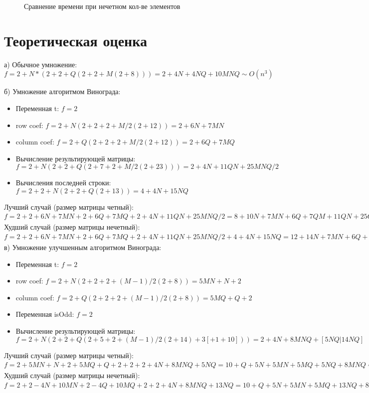 	
	\newpage
	
	\begin{figure}[h!]
		\center{\texttt{[image: 4et]}}
		\caption{Сравнение времени при четном кол-ве элементов}
		
		\hfill
		
		\center{\texttt{[image: ne4et]}}
		\caption{Сравнение времени при нечетном кол-ве элементов}
	\end{figure}


	\newpage
	\section{Теоретическая оценка }
	\flushleft
	а) Обычное умножение:\\
	$f = 2+N*(2+2+Q(2+2+M(2+8))) = 2+4N+4NQ+10MNQ \sim O(n^3)$
	
	б) Умножение алгоритмом Винограда:
	\begin{itemize}
		\item Переменная t: $f = 2$
		\item row coef: $f = 2+N(2+2+2+M/2(2+12)) = 2+6N+7MN$
		\item column coef: $f = 2+Q(2+2+2+M/2(2+12)) = 2+6Q+7MQ$
		\item Вычисление результирующей матрицы: $f = 2+N(2+2+Q(2+7+2+M/2(2+23))) = 2+4N+11QN+25MNQ/2$
		\item Вычисления последней строки: $f = 2+2+N(2+2+Q(2+13)) = 4+4N+15NQ$ 
	\end{itemize}
	Лучший случай (размер матрицы четный): $f = 2+2+6N+7MN+2+6Q+7MQ+2+4N+11QN+25MNQ/2 = 8+10N+7MN+6Q+7QM+11QN+25QMN/2 \sim O(n^3)$\\
	Худший случай (размер матрицы нечетный): $f = 2+2+6N+7MN+2+6Q+7MQ+2+4N+11QN+25MNQ/2+4+4N+15NQ = 12+14N+7MN+6Q+7QM+26QN+25QMN/2 \sim O(n^3)$\\
	
	в) Умножение улучшенным алгоритмом Винограда:\\
	\begin{itemize}
		\item Переменная t: $f = 2$
		\item row coef: $f = 2+N(2+2+2+(M-1)/2(2+8)) = 5MN+N+2$
		\item column coef: $f = 2+Q(2+2+2+(M-1)/2(2+8)) = 5MQ+Q+2$
		\item Переменная isOdd: $f = 2$
		\item Вычисление результирующей матрицы: $f = 2+N(2+2+Q(2+5+2+(M-1)/2(2+14)+3[+1+10])) = 2+4N+8MNQ+[5NQ|14NQ]$
	\end{itemize}
	Лучший случай (размер матрицы четный): $f = 2+5MN+N+2+5MQ+Q+2+2+2+4N+8MNQ+5NQ = 10+Q+5N+5MN+5MQ+5NQ+8MNQ \sim O(n^3)$\\
	Худший случай (размер матрицы нечетный): $f = 2+2-4N+10MN+2-4Q+10MQ+2+2+4N+8MNQ+13NQ = 10+Q+5N+5MN+5MQ+13NQ+8MNQ \sim O(n^3)$\\
	\flushleft
	

